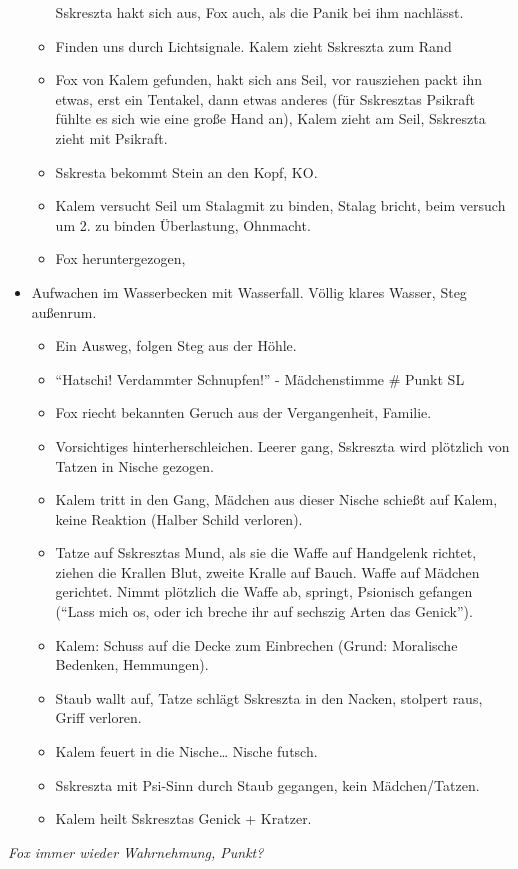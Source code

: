 \documentclass[11pt]{scrartcl}
\begin{document}
\begin{itemize}
\begin{itemize}
    Sskreszta hakt sich aus, Fox auch, als die Panik bei ihm nachlässt.
  \item
    Finden uns durch Lichtsignale. Kalem zieht Sskreszta zum Rand
  \item
    Fox von Kalem gefunden, hakt sich ans Seil, vor rausziehen packt ihn
    etwas, erst ein Tentakel, dann etwas anderes (für Sskresztas
    Psikraft fühlte es sich wie eine große Hand an), Kalem zieht am
    Seil, Sskreszta zieht mit Psikraft.
  \item
    Sskresta bekommt Stein an den Kopf, KO.
  \item
    Kalem versucht Seil um Stalagmit zu binden, Stalag bricht, beim
    versuch um 2. zu binden Überlastung, Ohnmacht.
  \item
    Fox heruntergezogen,
  \end{itemize}
\item
  Aufwachen im Wasserbecken mit Wasserfall. Völlig klares Wasser, Steg
  außenrum.

  \begin{itemize}
  \item
    Ein Ausweg, folgen Steg aus der Höhle.
  \item
    ``Hatschi! Verdammter Schnupfen!'' - Mädchenstimme \# Punkt SL
  \item
    Fox riecht bekannten Geruch aus der Vergangenheit, Familie.
  \item
    Vorsichtiges hinterherschleichen. Leerer gang, Sskreszta wird
    plötzlich von Tatzen in Nische gezogen.
  \item
    Kalem tritt in den Gang, Mädchen aus dieser Nische schießt auf
    Kalem, keine Reaktion (Halber Schild verloren).
  \item
    Tatze auf Sskresztas Mund, als sie die Waffe auf Handgelenk richtet,
    ziehen die Krallen Blut, zweite Kralle auf Bauch. Waffe auf Mädchen
    gerichtet. Nimmt plötzlich die Waffe ab, springt, Psionisch gefangen
    (``Lass mich os, oder ich breche ihr auf sechszig Arten das
    Genick'').
  \item
    Kalem: Schuss auf die Decke zum Einbrechen (Grund: Moralische
    Bedenken, Hemmungen).
  \item
    Staub wallt auf, Tatze schlägt Sskreszta in den Nacken, stolpert
    raus, Griff verloren.
  \item
    Kalem feuert in die Nische\ldots{} Nische futsch.
  \item
    Sskreszta mit Psi-Sinn durch Staub gegangen, kein Mädchen/Tatzen.
  \item
    Kalem heilt Sskresztas Genick + Kratzer.
  \end{itemize}
\end{itemize}
\emph{Fox immer wieder Wahrnehmung, Punkt?}
\end{document}
